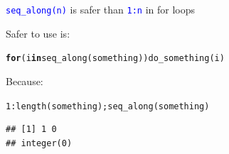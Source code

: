 \documentclass[xcolor=table,      handout ,    xcolor=dvipsnames]{beamer}\usepackage[]{graphicx}\usepackage[]{color}
\makeatletter
\newcommand{\hlnum}[1]{\textcolor[rgb]{0,0,0}{#1}}
\newcommand{\hlopt}[1]{\textcolor[rgb]{0,0,0}{#1}}
\newcommand{\hlstd}[1]{\textcolor[rgb]{0,0,0}{#1}}
\newcommand{\hlkwa}[1]{\textcolor[rgb]{1,0,0}{\textbf{#1}}}
\newcommand{\hlkwd}[1]{\textcolor[rgb]{0,0,1}{#1}}
\newenvironment{kframe}{%
 \def\at@end@of@kframe{}%
 \ifinner\ifhmode%
  \def\at@end@of@kframe{\end{minipage}}%
  \begin{minipage}{\columnwidth}%
 \fi\fi%
 \def\FrameCommand##1{\hskip\@totalleftmargin \hskip-\fboxsep
 \colorbox{shadecolor}{##1}\hskip-\fboxsep
     \hskip-\linewidth \hskip-\@totalleftmargin \hskip\columnwidth}%
 \MakeFramed {\advance\hsize-\width
   \@totalleftmargin\z@ \linewidth\hsize
   \@setminipage}}%
 {\par\unskip\endMakeFramed%
 \at@end@of@kframe}
\newenvironment{knitrout}{}{} %
\newcommand{\rcode}[1]{\texttt{\textcolor{Blue}{#1}}}
\makeatother
\begin{document}
\begin{frame}[fragile]{\rcode{seq\_along(n)} is safer than \rcode{1:n} in \alert{for} loops}
\begin{knitrout}
\begin{kframe}
{\ttfamily\noindent\bfseries\color{errorcolor}{\#\# Error in do\_something(i): x must be >=1, not:0}}\end{kframe}
\end{knitrout}
\pause
Safer to use is:\vspace{-0.7em}
\begin{knitrout}
\color{fgcolor}\begin{kframe}
\begin{alltt}
\hlkwa{for}\hlstd{(i} \hlkwa{in} \hlkwd{seq_along}\hlstd{(something))} \hlkwd{do_something}\hlstd{(i)}
\end{alltt}
\end{kframe}
\end{knitrout}
\pause
Because:\vspace{-0.5em}
\begin{knitrout}\scriptsize
{}\color{fgcolor}\begin{kframe}
\begin{alltt}
\hlnum{1}\hlopt{:}\hlkwd{length}\hlstd{(something)     ;}   \hlkwd{seq_along}\hlstd{(something)}
\end{alltt}
\begin{verbatim}
## [1] 1 0
## integer(0)
\end{verbatim}
\end{kframe}
\end{knitrout}
\end{frame}

\end{document}

